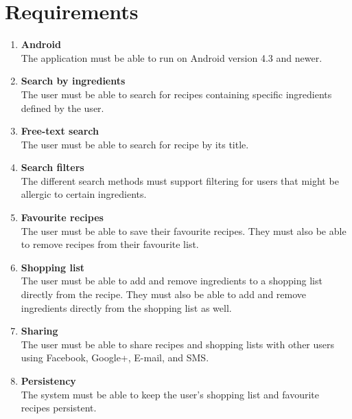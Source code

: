 \section{Requirements}\label{sec:requirement}

\begin{enumerate}
  \item\label{req:android} \textbf{Android} \\
    The application must be able to run on Android version 4.3 and newer.
    
  \item\label{req:ingredientsearch} \textbf{Search by ingredients} \\
    The user must be able to search for recipes containing specific ingredients defined by the user.
    
  \item\label{req:recipesearch} \textbf{Free-text search} \\
    The user must be able to search for recipe by its title.
    
  \item\label{req:searchfilters} \textbf{Search filters} \\
    The different search methods must support filtering for users that might be allergic to certain ingredients.
    
  \item\label{req:favourite} \textbf{Favourite recipes} \\
    The user must be able to save their favourite recipes. They must also be able to remove recipes from their favourite list.
    
  \item\label{req:shoppinglist} \textbf{Shopping list} \\
    The user must be able to add and remove ingredients to a shopping list directly from the recipe. They must also be able to add and remove ingredients directly from the shopping list as well.
    
  \item\label{req:sharing} \textbf{Sharing} \\
    The user must be able to share recipes and shopping lists with other users using Facebook, Google+, E-mail, and SMS.
    
  \item\label{req:persistency} \textbf{Persistency} \\
    The system must be able to keep the user's shopping list and favourite recipes persistent.
    

\end{enumerate}
